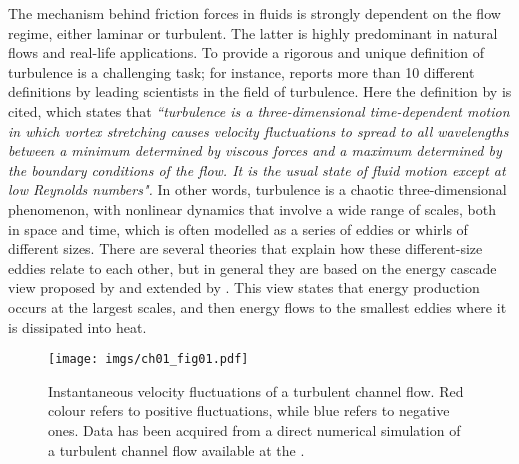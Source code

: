 The mechanism behind friction forces in fluids is strongly dependent on the flow regime, either laminar or turbulent.
The latter is highly predominant in natural flows and real-life applications.
To provide a rigorous and unique definition of turbulence is a challenging task; for instance, \citet{tsinober2009informal} reports more than 10 different definitions by leading scientists in the field of turbulence.
Here the definition by \cite{bradshaw2013introduction} is cited, which states that \textit{``turbulence is a three-dimensional time-dependent motion in which vortex stretching causes velocity fluctuations to spread to all wavelengths between a minimum determined by viscous forces and a maximum determined by the boundary conditions of the flow. It is the usual state of fluid motion except at low Reynolds numbers".}
In other words, turbulence is a chaotic three-dimensional phenomenon, with nonlinear dynamics that involve a wide range of scales, both in space and time, which is often modelled as a series of eddies or whirls of different sizes.
There are several theories that explain how these different-size eddies relate to each other, but in general they are based on the energy cascade view proposed by \citet{richardson1920supply} and extended by \citet{kolmogorov1941energy}.
This view states that energy production occurs at the largest scales, and then energy flows to the smallest eddies where it is dissipated into heat.
\begin{figure}
  \centering
  \texttt{[image: imgs/ch01\_fig01.pdf]}
  \caption{\label{ch01:fig01}Instantaneous velocity fluctuations of a turbulent channel flow. Red colour refers to positive fluctuations, while blue refers to negative ones. Data has been acquired from a direct numerical simulation of a turbulent channel flow available at the \href{https://doi.org/10.7281/T1PV6HJV}{\color{blue}{Johns Hopkins Turbulence Database}}.}
\end{figure}

